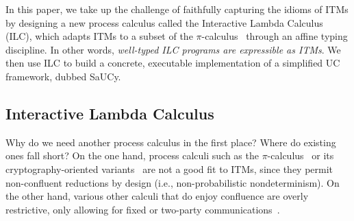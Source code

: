 
In this paper, we take up the challenge of faithfully capturing the idioms of
ITMs by designing a new process calculus called the Interactive Lambda Calculus
(ILC), which adapts ITMs to a subset of the
$\pi$-calculus~\cite{milner1999communicating} through an affine typing
discipline. In other words, \emph{well-typed ILC programs are expressible as
  ITMs}. We then use ILC to build a concrete, executable implementation of a
simplified UC framework, dubbed SaUCy.


\subsection{Interactive Lambda Calculus}
Why do we need another process calculus in the first place? Where do existing
ones fall short? On the one hand, process calculi such as the
$\pi$-calculus~\cite{milner1999communicating} or its cryptography-oriented
variants~\cite{abadi1999calculus, abadi2001mobile, lincoln1998probabilistic} are
not a good fit to ITMs, since they permit non-confluent reductions by design
(i.e., non-probabilistic nondeterminism).  On the other hand, various other
calculi that do enjoy confluence are overly restrictive, only allowing for fixed
or two-party
communications~\cite{kobayashi1999linearity,bohl2016symbolic,fowler2018session}.

